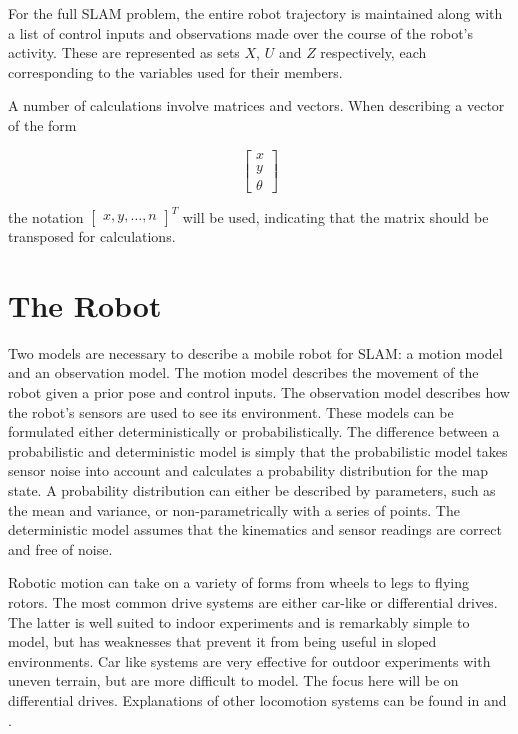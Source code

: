 \documentclass[12pt]{article}
\begin{document}
For the full SLAM problem, the entire robot trajectory is maintained along with a list of control inputs and observations made over the course of the robot’s activity.  These are represented as sets $X$, $U$ and $Z$ respectively, each corresponding to the variables used for their members.   

A number of calculations involve matrices and vectors.  When describing a vector of the form

\[
\left[ {\begin{array}{cc}
 x \\
 y \\
\theta
\end{array} } \right]
\]

the notation $\left[ {\begin{array}{cc} x, y, \dots, n\end{array} }\right]^T$ will be used, indicating that the matrix should be transposed for calculations.  

\section{The Robot}

Two models are necessary to describe a mobile robot for SLAM:  a motion model and an observation model.  The motion model describes the movement of the robot given a prior pose and control inputs.  The observation model describes how the robot’s sensors are used to see its environment.  These models can be formulated either deterministically or probabilistically.  The difference between a probabilistic and deterministic model is simply that the probabilistic model takes sensor noise into account and calculates a probability distribution for the map state.  A probability distribution can either be described by parameters, such as the mean and variance, or non-parametrically with a series of points.  The deterministic model assumes that the kinematics and sensor readings are correct and free of noise.  

Robotic motion can take on a variety of forms from wheels to legs to flying rotors.  The most common drive systems are either car-like or differential drives.  The latter is well suited to indoor experiments and is remarkably simple to model, but has weaknesses that prevent it from being useful in sloped environments.  Car like systems are very effective for outdoor experiments with uneven terrain, but are more difficult to model.  The focus here will be on differential drives.  Explanations of other locomotion systems can be found in \cite{Dudek} and \cite{DBLP}.
\end{document}
